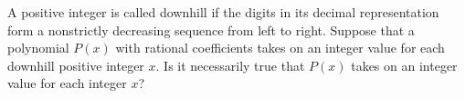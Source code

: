 A positive integer is called downhill if the digits in its decimal representation form a nonstrictly decreasing sequence from left to right. Suppose that a polynomial $P(x)$ with rational coefficients takes on an integer value for each downhill positive integer $x$. Is it necessarily true that $P(x)$ takes on an integer value for each integer $x$?
